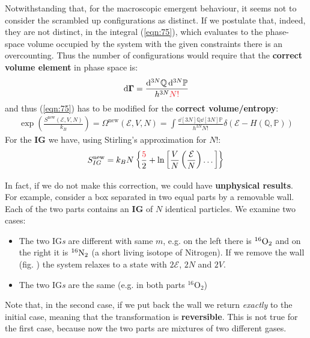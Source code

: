 \documentclass[../../main.tex]{subfiles}
\begin{document}
Notwithstanding that, for the macroscopic emergent behaviour, it seems  not to consider the scrambled up configurations as distinct. If we postulate that, indeed, they are not distinct, in the integral (\ref{eqn:75}), which evaluates to the phase-space volume occupied by the system with the given constraints there is an overcounting. Thus the number of  configurations would require that the \textbf{correct volume element} in phase space is:
\begin{align}
    \label{eqn:76}
    \dd{\bm{\Gamma}} = \frac{\dd[3N]{\mathbb{Q}} \dd[3N]{\mathbb{P}}}{h^{3N} \textcolor{Red}{N!}} 
\end{align} 
and thus (\ref{eqn:75}) has to be modified for the \textbf{correct volume/entropy}:
\begin{align}\label{eqn:77}
    \exp(\frac{S^{\mathrm{new} }(\mathcal{E}, V, N)}{k_B} ) = \Omega^{\mathrm{new}}(\mathcal{E}, V, N) = \int \frac{\dd[3N]{\mathbb{Q}} \dd[3N]{\mathbb{P}}}{h^{3N}N!} \delta(\mathcal{E}-H(\mathbb{Q}, \mathbb{P})) 
\end{align} 
For the \textbf{IG} we have, using Stirling's approximation for $N!$:
\begin{align}
    S_{IG}^{\mathrm{new}} = k_B N \left\{\frac{\textcolor{Red}{5}}{2} + \ln \left[\frac{V}{N} \left(\frac{\mathcal{E}}{N} \right) \dots \right]\right\} \label{eqn:79}
\end{align} 

In fact, if we do not make this correction, we could have \textbf{unphysical results}. For example, consider a box separated in two equal parts by a removable wall. Each of the two parts contains an \textbf{IG} of $N$ identical particles. We examine two cases:
\begin{itemize}
    \item The two IG\textit{s} are different with same $m$, e.g. on the left there is $^{16}\rm{O}_2$ and on the right it is $^{16}{\rm{N}}_2$ (a short living isotope of Nitrogen). If we remove the wall (fig. )%
    the system relaxes to a state with $2 \mathcal{E}$, $2N$ and $2V$.
    \item The two IG\textit{s} are the same (e.g. in both parts $^{16}{\mathrm{O}}_2$) 
\end{itemize}
Note that, in the second case, if we put back the wall we return \textit{exactly} to the initial case, meaning that the transformation is \textbf{reversible}. This is not true for the first case, because now the two parts are mixtures of two different gases. 
\end{document}
